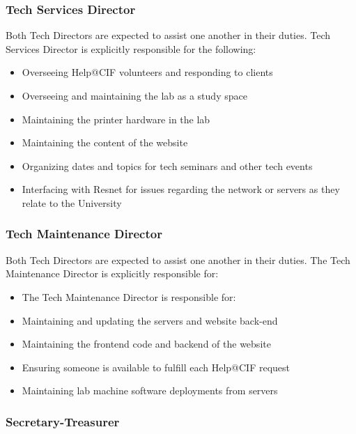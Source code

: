 		\subsubsection{Tech Services Director}\label{ssub:tech-services-director}

Both Tech Directors are expected to assist one another in their duties. Tech Services Director is explicitly responsible for the following:
\begin{itemize}
	\item Overseeing Help@CIF volunteers and responding to clients
	\item Overseeing and maintaining the lab as a study space
	\item Maintaining the printer hardware in the lab
	\item Maintaining the content of the website
	\item Organizing dates and topics for tech seminars and other tech events
	\item Interfacing with Resnet for issues regarding the network or servers as they relate to the University
\end{itemize}



		\subsubsection{Tech Maintenance Director}\label{ssub:tech-maintenance-director}

Both Tech Directors are expected to assist one another in their duties. The Tech Maintenance Director is explicitly responsible for:
\begin{itemize}
	\item The Tech Maintenance Director is responsible for:
 
	\item Maintaining and updating the servers and website back-end
	\item Maintaining the frontend code and backend of the website
	\item Ensuring someone is available to fulfill each Help@CIF request
	\item Maintaining lab machine software deployments from servers
\end{itemize}



		\subsubsection{Secretary-Treasurer}\label{ssub:secretary-treasurer}

